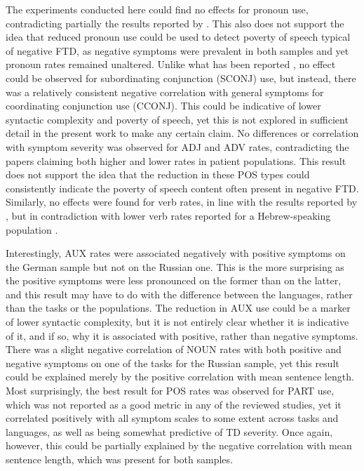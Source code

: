 The experiments conducted here could find no effects for pronoun use, contradicting partially the results reported by \citet{corcoran2018prediction, jeong2023exploring}. 
This also does not support the idea that reduced pronoun use could be used to detect poverty of speech typical of negative FTD, as negative symptoms were prevalent in both samples and yet pronoun rates remained unaltered.
Unlike what has been reported \citep{silva2022syntactic}, no effect could be observed for subordinating conjunction (SCONJ) use, but instead, there was a relatively consistent negative correlation with general symptoms for coordinating conjunction use (CCONJ). This could be indicative of lower syntactic complexity and poverty of speech, yet this is not explored in sufficient detail in the present work to make any certain claim.
No differences or correlation with symptom severity was observed for ADJ and ADV rates, contradicting the papers claiming both higher \citep{corcoran2018prediction, tang2021natural, ziv2022morphological} and lower \citep{argolo2023burnishing} rates in patient populations. This result does not support the idea that the reduction in these POS types could consistently indicate the poverty of speech content often present in negative FTD.
Similarly, no effects were found for verb rates, in line with the results reported by \citet{tang2021natural, argolo2023burnishing, haas2020linking}, but in contradiction with lower verb rates reported for a Hebrew-speaking population \citep{ziv2022morphological}.

Interestingly, AUX rates were associated negatively with positive symptoms on the German sample but not on the Russian one. This is the more surprising as the positive symptoms were less pronounced on the former than on the latter, and this result may have to do with the difference between the languages, rather than the tasks or the populations. The reduction in AUX use could be a marker of lower syntactic complexity, but it is not entirely clear whether it is indicative of it, and if so, why it is associated with positive, rather than negative symptoms.
There was a slight negative correlation of NOUN rates with both positive and negative symptoms on one of the tasks for the Russian sample, yet this result could be explained merely by the positive correlation with mean sentence length.
Most surprisingly, the best result for POS rates was observed for PART use, which was not reported as a good metric in any of the reviewed studies, yet it correlated positively with all symptom scales to some extent across tasks and languages, as well as being somewhat predictive of TD severity. Once again, however, this could be partially explained by the negative correlation with mean sentence length, which was present for both samples.

